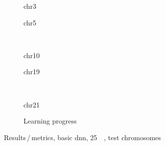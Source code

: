 \begin{figure}[p]
    \begin{subfigure}{0.45\textwidth}
        \scriptsize
        \caption{chr3}
    \end{subfigure} \hfill
    \begin{subfigure}{0.45\textwidth}
        \scriptsize
        \caption{chr5}
    \end{subfigure}\\[5mm]
    \begin{subfigure}{0.45\textwidth}
        \scriptsize
        \caption{chr10}
    \end{subfigure}\hfill
    \begin{subfigure}{0.45\textwidth}
        \scriptsize
        \caption{chr19}
    \end{subfigure}\\[3mm]
    \centering
    \begin{subfigure}{0.45\textwidth}
        \scriptsize
        \caption{chr21}
    \end{subfigure}\hfill
    \begin{subfigure}{0.45\textwidth}
        \caption{Learning progress}\label{fig:results:basicDNN_lossEpochs_25}
    \end{subfigure}
    \caption{Results\,/\,metrics, basic \acrshort{dnn}, \SI{25}{\kilo\bp}, test chromosomes}
    \label{fig:results:basicDNN_pearson}
\end{figure}

